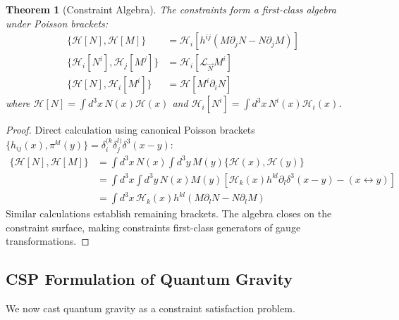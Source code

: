 \documentclass[11pt,a4paper]{article}
\newtheorem{theorem}{Theorem}[section]
\theoremstyle{remark}
\theoremstyle{definition}
\begin{document}
\begin{theorem}[Constraint Algebra]
The constraints form a first-class algebra under Poisson brackets:
\begin{align}
\{\mathcal{H}[N], \mathcal{H}[M]\} &= \mathcal{H}_i[h^{ij}(M \partial_j N - N \partial_j M)] \\
\{\mathcal{H}_i[N^i], \mathcal{H}_j[M^j]\} &= \mathcal{H}_i[\mathcal{L}_{\vec{N}} M^i] \\
\{\mathcal{H}[N], \mathcal{H}_i[M^i]\} &= \mathcal{H}[M^i \partial_i N]
\end{align}
where $\mathcal{H}[N] = \int d^3x \, N(x) \mathcal{H}(x)$ and $\mathcal{H}_i[N^i] = \int d^3x \, N^i(x) \mathcal{H}_i(x)$.
\end{theorem}

\begin{proof}
Direct calculation using canonical Poisson brackets $\{h_{ij}(x), \pi^{kl}(y)\} = \delta^{(k}_i \delta^{l)}_{j} \delta^3(x-y)$:
\begin{align}
\{\mathcal{H}[N], \mathcal{H}[M]\} &= \int d^3x \, N(x) \int d^3y \, M(y) \{\mathcal{H}(x), \mathcal{H}(y)\} \\
&= \int d^3x \int d^3y \, N(x) M(y) \left[\mathcal{H}_k(x) h^{kl} \partial_l \delta^3(x-y) - (x \leftrightarrow y)\right] \\
&= \int d^3x \, \mathcal{H}_k(x) h^{kl}(M \partial_l N - N \partial_l M)
\end{align}
Similar calculations establish remaining brackets. The algebra closes on the constraint surface, making constraints first-class generators of gauge transformations.
\end{proof}

\subsection{CSP Formulation of Quantum Gravity}

We now cast quantum gravity as a constraint satisfaction problem.
\end{document}
